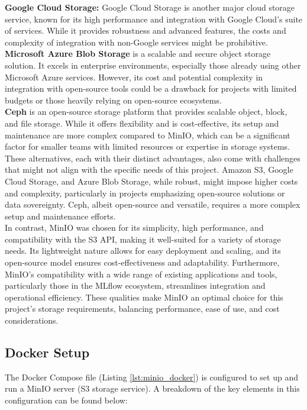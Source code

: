 \textbf{Google Cloud Storage:} Google Cloud Storage \cite{GoogleCloudStorageDocs} is another major cloud storage service, known for its high performance and integration with Google Cloud's suite of services. While it provides robustness and advanced features, the costs and complexity of integration with non-Google services might be prohibitive. \\

\textbf{Microsoft Azure Blob Storage} \cite{AzureBlobStorageDocs} is a scalable and secure object storage solution. It excels in enterprise environments, especially those already using other Microsoft Azure services. However, its cost and potential complexity in integration with open-source tools could be a drawback for projects with limited budgets or those heavily relying on open-source ecosystems. \\

\textbf{Ceph} \cite{CephDocs} is an open-source storage platform that provides scalable object, block, and file storage. While it offers flexibility and is cost-effective, its setup and maintenance are more complex compared to MinIO, which can be a significant factor for smaller teams with limited resources or expertise in storage systems. \\

These alternatives, each with their distinct advantages, also come with challenges that might not align with the specific needs of this project. Amazon S3, Google Cloud Storage, and Azure Blob Storage, while robust, might impose higher costs and complexity, particularly in projects emphasizing open-source solutions or data sovereignty. Ceph, albeit open-source and versatile, requires a more complex setup and maintenance efforts. \\

In contrast, MinIO was chosen for its simplicity, high performance, and compatibility with the S3 API, making it well-suited for a variety of storage needs. Its lightweight nature allows for easy deployment and scaling, and its open-source model ensures cost-effectiveness and adaptability. Furthermore, MinIO's compatibility with a wide range of existing applications and tools, particularly those in the MLflow ecosystem, streamlines integration and operational efficiency. These qualities make MinIO an optimal choice for this project's storage requirements, balancing performance, ease of use, and cost considerations.

\subsection{Docker Setup}
The Docker Compose file (Listing \ref{lst:minio_docker}) is configured to set up and run a MinIO server (S3 storage service). A breakdown of the key elements in this configuration can be found below:

